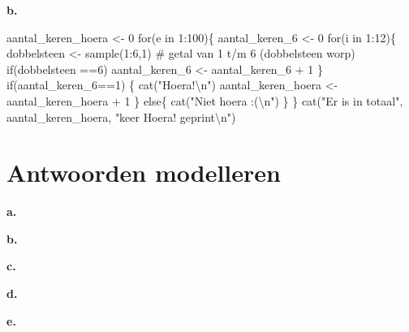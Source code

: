 \documentclass[
  a4paper,
]{scrbook}
\newenvironment{Shaded}{\begin{snugshade}}{\end{snugshade}}
\newcommand{\CommentTok}[1]{\textcolor[rgb]{0.37,0.37,0.37}{#1}}
\newcommand{\ControlFlowTok}[1]{\textcolor[rgb]{0.00,0.23,0.31}{#1}}
\newcommand{\DecValTok}[1]{\textcolor[rgb]{0.68,0.00,0.00}{#1}}
\newcommand{\FunctionTok}[1]{\textcolor[rgb]{0.28,0.35,0.67}{#1}}
\newcommand{\NormalTok}[1]{\textcolor[rgb]{0.00,0.23,0.31}{#1}}
\newcommand{\OtherTok}[1]{\textcolor[rgb]{0.00,0.23,0.31}{#1}}
\newcommand{\SpecialCharTok}[1]{\textcolor[rgb]{0.37,0.37,0.37}{#1}}
\newcommand{\StringTok}[1]{\textcolor[rgb]{0.13,0.47,0.30}{#1}}
\theoremstyle{definition}
\theoremstyle{remark}
\begin{document}
\textbf{b.}

\begin{Shaded}
\begin{Highlighting}[]
\NormalTok{aantal\_keren\_hoera }\OtherTok{\textless{}{-}} \DecValTok{0}
\ControlFlowTok{for}\NormalTok{(e }\ControlFlowTok{in} \DecValTok{1}\SpecialCharTok{:}\DecValTok{100}\NormalTok{)\{}
\NormalTok{  aantal\_keren\_6 }\OtherTok{\textless{}{-}} \DecValTok{0}
  \ControlFlowTok{for}\NormalTok{(i }\ControlFlowTok{in} \DecValTok{1}\SpecialCharTok{:}\DecValTok{12}\NormalTok{)\{}
\NormalTok{    dobbelsteen }\OtherTok{\textless{}{-}} \FunctionTok{sample}\NormalTok{(}\DecValTok{1}\SpecialCharTok{:}\DecValTok{6}\NormalTok{,}\DecValTok{1}\NormalTok{) }\CommentTok{\# getal van 1 t/m 6 (dobbelsteen worp)}
    \ControlFlowTok{if}\NormalTok{(dobbelsteen }\SpecialCharTok{==}\DecValTok{6}\NormalTok{) aantal\_keren\_6 }\OtherTok{\textless{}{-}}\NormalTok{ aantal\_keren\_6 }\SpecialCharTok{+} \DecValTok{1}
\NormalTok{  \}}
  \ControlFlowTok{if}\NormalTok{(aantal\_keren\_6}\SpecialCharTok{==}\DecValTok{1}\NormalTok{) \{}
    \FunctionTok{cat}\NormalTok{(}\StringTok{"Hoera!}\SpecialCharTok{\textbackslash{}n}\StringTok{"}\NormalTok{)}
\NormalTok{    aantal\_keren\_hoera }\OtherTok{\textless{}{-}}\NormalTok{ aantal\_keren\_hoera }\SpecialCharTok{+} \DecValTok{1}
\NormalTok{  \}}
  \ControlFlowTok{else}\NormalTok{\{}
    \FunctionTok{cat}\NormalTok{(}\StringTok{"Niet hoera :(}\SpecialCharTok{\textbackslash{}n}\StringTok{"}\NormalTok{)}
\NormalTok{  \}}
\NormalTok{\}}
\FunctionTok{cat}\NormalTok{(}\StringTok{"Er is in totaal"}\NormalTok{, aantal\_keren\_hoera, }\StringTok{"keer \textquotesingle{}Hoera!\textquotesingle{} geprint}\SpecialCharTok{\textbackslash{}n}\StringTok{"}\NormalTok{)}
\end{Highlighting}
\end{Shaded}

\hypertarget{antwoorden-modelleren}{%
\chapter*{Antwoorden modelleren}\label{antwoorden-modelleren}}


\textbf{a.}

\textbf{b.}

\textbf{c.}

\textbf{d.}

\textbf{e.}
\end{document}

